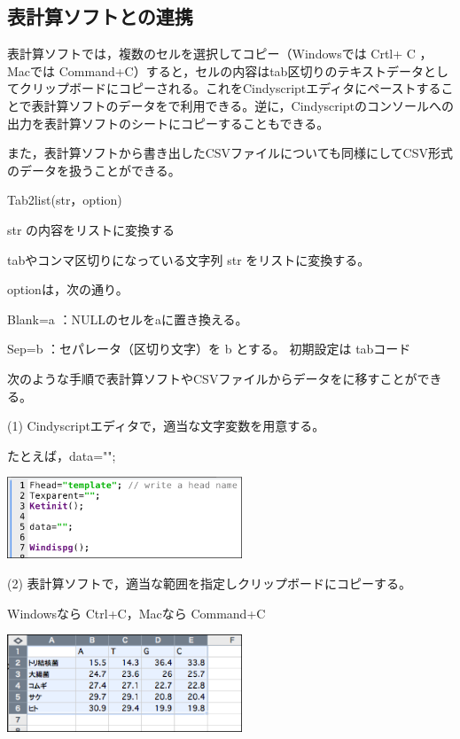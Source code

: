 \documentclass[papersize,a4paper,12pt,uplatex]{jsarticle}
\begin{document}
\newpage
\subsection{表計算ソフトとの連携}
表計算ソフトでは，複数のセルを選択してコピー（Windowsでは Crtl+ C ，Macでは Command+C）すると，セルの内容はtab区切りのテキストデータとしてクリップボードにコピーされる。これをCindyscriptエディタにペーストすることで表計算ソフトのデータを\ketcindy で利用できる。逆に，Cindyscriptのコンソールへの出力を表計算ソフトのシートにコピーすることもできる。

また，表計算ソフトから書き出したCSVファイルについても同様にしてCSV形式のデータを扱うことができる。

\begin{description}
\hypertarget{tab2list}{}
\item[関数]  Tab2list(str，option)
\item[機能]  str の内容をリストに変換する
\item[説明]  tabやコンマ区切りになっている文字列 str をリストに変換する。

 optionは，次の通り。
 
 Blank=a  ：NULLのセルをaに置き換える。
 
Sep=b    ：セパレータ（区切り文字）を b とする。 初期設定は tabコード

次のような手順で表計算ソフトやCSVファイルからデータを\ketcindy に移すことができる。

\vspace{\baselineskip}
(1) Cindyscriptエディタで，適当な文字変数を用意する。

  たとえば，data="";
  
\vspace{\baselineskip}
\hspace{10mm} \includegraphics[bb=0 0 429.02 149.01 , width=7cm]{Fig/tab2list02.pdf}

\vspace{\baselineskip}
(2) 表計算ソフトで，適当な範囲を指定しクリップボードにコピーする。

  Windowsなら Ctrl+C，Macなら Command+C
  
\vspace{\baselineskip}
\hspace{10mm} \includegraphics[bb=0 0 371.02 154 , width=7cm]{Fig/tab2list01.pdf}


\end{description}
\end{document}
